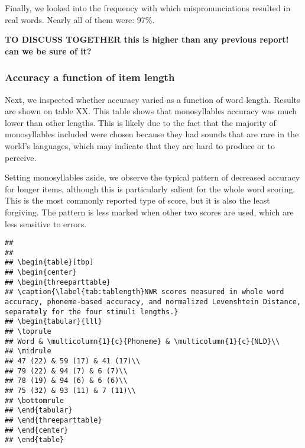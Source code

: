 \documentclass[english,,man,floatsintext]{apa6}
\begin{document}
Finally, we looked into the frequency with which mispronunciations
resulted in real words. Nearly all of them were: 97\%.

\textbf{TO DISCUSS TOGETHER this is higher than any previous report! can
we be sure of it?}

\subsubsection{Accuracy a function of item
length}\label{accuracy-a-function-of-item-length}

Next, we inspected whether accuracy varied as a function of word length.
Results are shown on table XX. This table shows that monosyllables
accuracy was much lower than other lengths. This is likely due to the
fact that the majority of monosyllables included were chosen because
they had sounds that are rare in the world's languages, which may
indicate that they are hard to produce or to perceive.

Setting monosyllables aside, we observe the typical pattern of decreased
accuracy for longer items, although this is particularly salient for the
whole word scoring. This is the most commonly reported type of score,
but it is also the least forgiving. The pattern is less marked when
other two scores are used, which are less sensitive to errors.

\begin{verbatim}
## 
## 
## \begin{table}[tbp]
## \begin{center}
## \begin{threeparttable}
## \caption{\label{tab:tablength}NWR scores measured in whole word accuracy, phoneme-based accuracy, and normalized Levenshtein Distance, separately for the four stimuli lengths.}
## \begin{tabular}{lll}
## \toprule
## Word & \multicolumn{1}{c}{Phoneme} & \multicolumn{1}{c}{NLD}\\
## \midrule
## 47 (22) & 59 (17) & 41 (17)\\
## 79 (22) & 94 (7) & 6 (7)\\
## 78 (19) & 94 (6) & 6 (6)\\
## 75 (32) & 93 (11) & 7 (11)\\
## \bottomrule
## \end{tabular}
## \end{threeparttable}
## \end{center}
## \end{table}
\end{verbatim}
\end{document}
